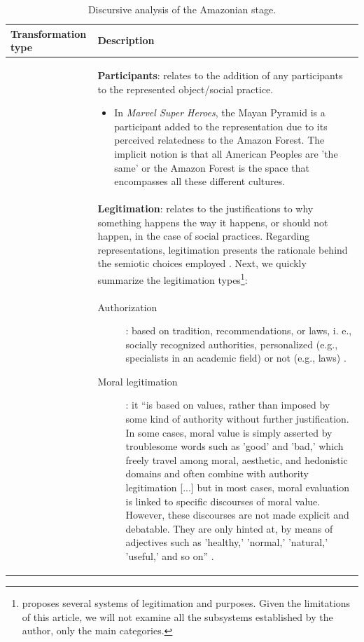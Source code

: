 \documentclass[english]{textolivre}
\begin{document}
\setlength\LTleft{-1in}\setlength\LTright{-1in}
\begin{small}
\renewcommand{\arraystretch}{1.5}
\begin{longtable}{
    >{\raggedright\arraybackslash}p{} 
    >{\raggedright\arraybackslash}p{}  
    }
\caption{Discursive analysis of the Amazonian stage.}
\label{table05}
\\
\toprule 
Transformation type & Description \\
\midrule
\multirow{4}{=}{Additive transformations} & 
\textbf{Participants}: relates to the addition of any participants to the represented object/social practice.
\begin{itemize}
    \item In \textit{Marvel Super Heroes}, the Mayan Pyramid is a participant added to the representation due to its perceived relatedness to the Amazon Forest. The implicit notion is that all American Peoples are 'the same' or the Amazon Forest is the space that encompasses all these different cultures.
\end{itemize} \\
& \textbf{Legitimation}: relates to the justifications to why something happens the way it happens, or should not happen, in the case of social practices. Regarding representations, legitimation presents the rationale behind the semiotic choices employed \cite[p. 20]{van_leeuwen_discourse_2008}. Next, we quickly summarize the legitimation types\footnote{\textcite{van_leeuwen_discourse_2008} proposes several systems of legitimation and purposes. Given the limitations of this article, we will not examine all the subsystems established by the author, only the main categories.}: 
\parfillskip=0pt \tabularnewline
&\begin{description}
    \item[Authorization]: based on tradition, recommendations, or laws, i. e., socially recognized authorities, personalized (e.g., specialists in an academic field) or not (e.g., laws) \cites[p. 105]{van_leeuwen_discourse_2008}.
    \item[Moral legitimation]: it “is based on values, rather than imposed by some kind of authority without further justification. In some cases, moral value is simply asserted by troublesome words such as 'good' and 'bad,' which freely travel among moral, aesthetic, and hedonistic domains and often combine with authority legitimation [...] but in most cases, moral evaluation is linked to specific discourses of moral value. However, these discourses are not made explicit and debatable. They are only hinted at, by means of adjectives such as 'healthy,' 'normal,' 'natural,' 'useful,' and so on” \cites[p. 109-110]{van_leeuwen_discourse_2008}.

\end{description}
\end{longtable}
\end{small}
\end{document}
